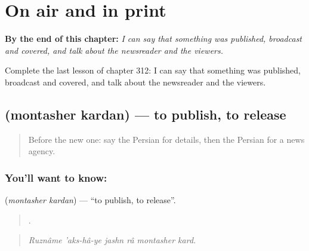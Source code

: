 
\chapter{On air and in print}
\label{ch:fa-on-air-and-in-print}

\begin{chapteropening}
\textbf{By the end of this chapter:} \emph{I can say that something was published, broadcast and covered, and talk about the newsreader and the viewers.}

Complete the last lesson of chapter 312: I can say that something was published, broadcast and covered, and talk about the newsreader and the viewers.
\end{chapteropening}

\section[\texorpdfstring{\fa{منتشر} \fa{کردن} (montasher kardan)}{منتشر کردن (montasher kardan)}]{  (montasher kardan) — to publish, to release}

\label{lesson:FA-C312-montasher-kardan}



\begin{quote}
Before the new one: say the Persian for details, then the Persian for a news agency.
\end{quote}

\subsection*{You'll want to know:  }
\textbf{ } (\emph{montasher kardan}) — \textquotedblleft{}to publish, to release\textquotedblright{}.

\begin{quote}
      .
\end{quote}

\begin{quote}
\emph{Ruznâme 'aks-hâ-ye jashn râ montasher kard.}
\end{quote}

